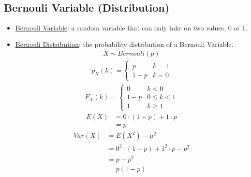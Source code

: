 \documentclass[12pt]{article}
\begin{document}
        \subsection{Bernouli Variable (Distribution)}
            \begin{itemize}
                \item \underline{Bernouli Variable}: a random variable that can only take on two values, $0$ or $1$.
                \item \underline{Bernouli Distribution}: the probability distribution of a Bernouli Variable.
                \begin{align*}
                    X \sim Bernouli(p)
                \end{align*}
                \begin{align*}
                    p_X(k) = \begin{cases}
                        p & k = 1 \\
                        1 - p & k = 0
                    \end{cases}
                \end{align*}
                \begin{align*}
                    F_X(k) = \begin{cases}
                        0 & k < 0 \\
                        1 - p & 0 \leq k < 1 \\
                        1 & k \geq 1
                    \end{cases}
                \end{align*}
                \begin{align*}
                    E(X) &= 0 \cdot (1 - p) + 1 \cdot p \\
                    &= p
                \end{align*}
                \begin{align*}
                    Var(X) &= E(X^2) - \mu^2 \\
                    &= 0^2 \cdot (1 - p) + 1^2 \cdot p - p^2 \\
                    &= p - p^2 \\
                    &= p(1 - p)
                \end{align*}
            \end{itemize}
\end{document}

